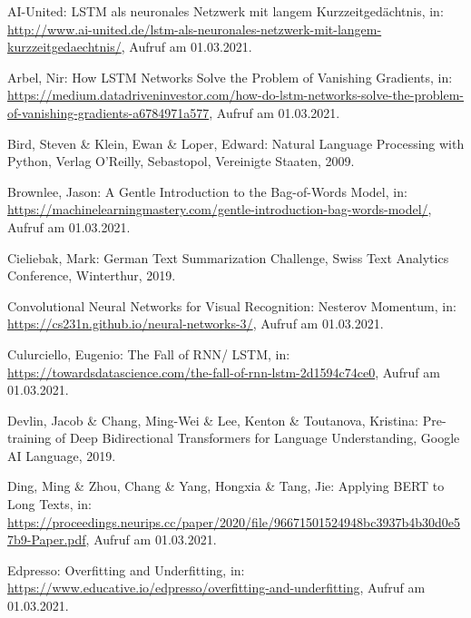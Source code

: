 \setcounter{page}{50}

\begin{thebibliography}{50}
\thispagestyle{fancy}

AI-United: LSTM als neuronales Netzwerk mit langem Kurzzeitgedächtnis, in: \url{http://www.ai-united.de/lstm-als-neuronales-netzwerk-mit-langem-kurzzeitgedaechtnis/}, Aufruf am 01.03.2021.

Arbel, Nir: How LSTM Networks Solve the Problem of Vanishing Gradients, in: \url{https://medium.datadriveninvestor.com/how-do-lstm-networks-solve-the-problem-of-vanishing-gradients-a6784971a577}, Aufruf am 01.03.2021.

Bird, Steven \& Klein, Ewan \& Loper, Edward: Natural Language Processing with Python, Verlag O'Reilly, Sebastopol, Vereinigte Staaten, 2009.

Brownlee, Jason: A Gentle Introduction to the Bag-of-Words Model, in: \url{https://machinelearningmastery.com/gentle-introduction-bag-words-model/}, Aufruf am 01.03.2021.

Cieliebak, Mark: German Text Summarization Challenge, Swiss Text Analytics Conference, Winterthur, 2019.

Convolutional Neural Networks for Visual Recognition: Nesterov Momentum, in: \url{https://cs231n.github.io/neural-networks-3/}, Aufruf am 01.03.2021.

Culurciello, Eugenio: The Fall of RNN/ LSTM, in: \url{https://towardsdatascience.com/the-fall-of-rnn-lstm-2d1594c74ce0}, Aufruf am 01.03.2021.

Devlin, Jacob \& Chang, Ming-Wei \& Lee, Kenton \& Toutanova, Kristina: Pre-training of Deep Bidirectional Transformers for
Language Understanding, Google AI Language, 2019.

Ding, Ming \& Zhou, Chang \& Yang, Hongxia \& Tang, Jie: Applying BERT to Long Texts, in: \url{https://proceedings.neurips.cc/paper/2020/file/96671501524948bc3937b4b30d0e57b9-Paper.pdf}, Aufruf am 01.03.2021.

Edpresso: Overfitting and Underfitting, in: \url{https://www.educative.io/edpresso/overfitting-and-underfitting}, Aufruf am 01.03.2021.


\end{thebibliography}
